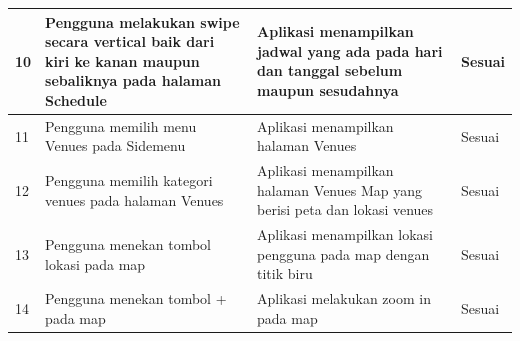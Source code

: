 \begin{table}[H]
\begin{tabular}{|p{0.3cm}|p{5.7cm}|p{5.7cm}|p{3cm}|}
10 & Pengguna melakukan swipe secara vertical baik dari kiri ke kanan maupun sebaliknya pada halaman Schedule & Aplikasi menampilkan jadwal yang ada pada hari dan tanggal sebelum maupun sesudahnya & Sesuai                 \\ \hline
11 & Pengguna memilih menu Venues pada Sidemenu                                          & Aplikasi menampilkan halaman Venues                                                  & Sesuai                 \\ \hline
12 & Pengguna memilih kategori venues pada halaman Venues                               & Aplikasi menampilkan halaman Venues Map yang berisi peta dan lokasi venues           & Sesuai                 \\ \hline
13 & Pengguna menekan tombol lokasi pada map                                            & Aplikasi menampilkan lokasi pengguna pada map dengan titik biru                      & Sesuai                 \\ \hline
14 & Pengguna menekan tombol + pada map                                                 & Aplikasi melakukan zoom in pada map                                                  & Sesuai                 \\ \hline
\end{tabular}
\end{table}

